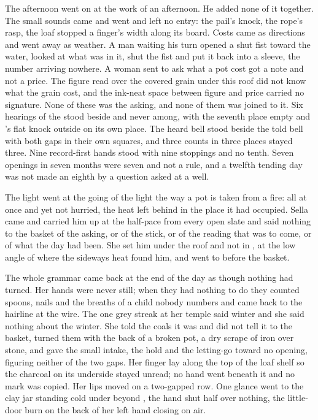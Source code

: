 The afternoon went on at the work of an afternoon. He added none of it together. The small sounds came and went and left no entry: the pail's knock, the rope's rasp, the loaf stopped a finger's width along its board. Costs came as directions and went away as weather. A man waiting his turn opened a shut fist toward the water, looked at what was in it, shut the fist and put it back into a sleeve, the number arriving nowhere. A woman sent to ask what a pot cost got a note and not a price. The figure read over the covered grain under this roof did not know what the grain cost, and the ink-neat space between figure and price carried no signature. None of these was the asking, and none of them was joined to it. Six hearings of the  stood beside and never among, with the seventh place empty and 's flat knock outside on its own place. The heard bell stood beside the told bell with both gaps in their own squares, and three counts in three places stayed three. Nine record-first hands stood with nine stoppings and no tenth. Seven openings in seven months were seven and not a rule, and a twelfth tending day was not made an eighth by a question asked at a well.

\scenebreak

The light went at the going of the light the way a pot is taken from a fire: all at once and yet not hurried, the heat left behind in the place it had occupied. Sella came and carried him up at the half-pace from every open slate and said nothing to the basket of the asking, or of the stick, or of the reading that was to come, or of what the day had been. She set him under the roof and not in , at the low angle of  where the sideways heat found him, and went to  before the basket.

The whole grammar came back at the end of the day as though nothing had turned. Her hands were never still; when they had nothing to do they counted spoons, nails and the breaths of a child nobody numbers and came back to the hairline at the wire. The one grey streak at her temple said winter and she said nothing about the winter. She told the coals it was  and did not tell it to the basket, turned them with the back of a broken pot, a dry scrape of iron over stone, and gave the small intake, the hold and the letting-go toward no opening, figuring neither of the two gaps. Her finger lay along the top of the loaf shelf so the charcoal on its underside stayed unread; no hand went beneath it and no mark was copied. Her lips moved on a two-gapped row. One glance went to the clay jar standing cold under  beyond , the hand shut half over nothing, the little-door burn on the back of her left hand closing on air.

